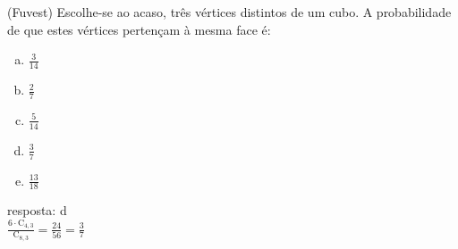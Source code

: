 \begin{ex}
 (Fuvest) Escolhe-se ao acaso, três vértices distintos de um cubo. A probabilidade de que estes vértices pertençam à mesma face é:
    \begin{enumerate}[(a)]
    \item $\frac{3}{14}$
    \item $\frac{2}{7}$
    \item $\frac{5}{14}$
    \item $\frac{3}{7}$
    \item $\frac{13}{18}$
    \end{enumerate}
      \begin{sol}
        resposta: d \\
        $\frac{6\cdot \mathrm{C}_{4,3}}{\mathrm{C}_{8,3}}=\frac{24}{56}=\frac{3}{7}$
      \end{sol}
\end{ex}